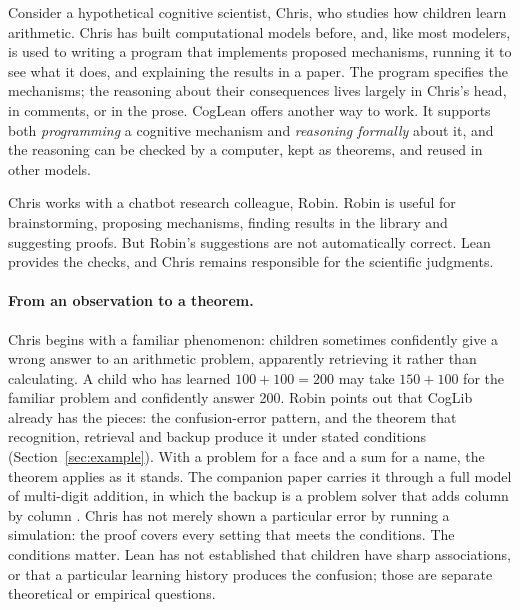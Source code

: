 \documentclass[11pt]{article}
\begin{document}
Consider a hypothetical cognitive scientist, Chris, who studies how children learn arithmetic. Chris has built computational models before, and, like most modelers, is used to writing a program that implements proposed mechanisms, running it to see what it does, and explaining the results in a paper. The program specifies the mechanisms; the reasoning about their consequences lives largely in Chris's head, in comments, or in the prose. CogLean offers another way to work. It supports both \emph{programming} a cognitive mechanism and \emph{reasoning formally} about it, and the reasoning can be checked by a computer, kept as theorems, and reused in other models.

Chris works with a chatbot research colleague, Robin. Robin is useful for brainstorming, proposing mechanisms, finding results in the library and suggesting proofs. But Robin's suggestions are not automatically correct. Lean provides the checks, and Chris remains responsible for the scientific judgments.

\paragraph{From an observation to a theorem.} Chris begins with a familiar phenomenon: children sometimes confidently give a wrong answer to an arithmetic problem, apparently retrieving it rather than calculating. A child who has learned $100+100=200$ may take $150+100$ for the familiar problem and confidently answer 200. Robin points out that CogLib already has the pieces: the confusion-error pattern, and the theorem that recognition, retrieval and backup produce it under stated conditions (Section~\ref{sec:example}). With a problem for a face and a sum for a name, the theorem applies as it stands. The companion paper carries it through a full model of multi-digit addition, in which the backup is a problem solver that adds column by column \citep{shrager2026multidigit}. Chris has not merely shown a particular error by running a simulation: the proof covers every setting that meets the conditions. The conditions matter. Lean has not established that children have sharp associations, or that a particular learning history produces the confusion; those are separate theoretical or empirical questions.
\end{document}

